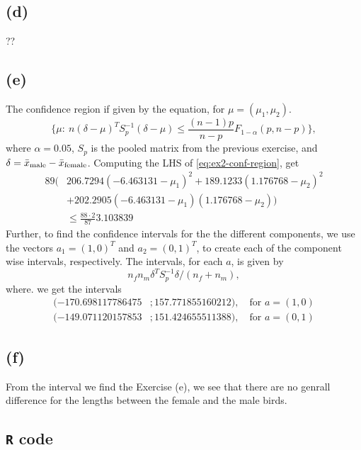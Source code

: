 \subsection*{(d)}
\label{sec:d}
??

\subsection*{(e)}
\label{sec:e}

The confidence region if given by the equation, for $\mu = (\mu_1, \mu_2).$
\begin{equation}
  \label{eq:ex2-conf-region}
 \{\mu:\ n (\delta - \mu)^T S_p^{-1} (\delta-\mu)\leq \frac{(n-1)p}{n-p}F_{1-\alpha}(p,n-p)\},
\end{equation}
where $\alpha = 0.05$, $S_p$ is the pooled matrix from the previous
exercise, and $\delta = \bar{x}_{\rm male}  - \bar{x}_{\rm
  female}$. Computing the LHS of \eqref{eq:ex2-conf-region}, get
\begin{align*}
  89
  \big(
    &206.7294 ( - 6.463131 -\mu_1)^2 + 189.1233(1.176768 -\mu_2)^2 \\
    &+ 202.2905(- 6.463131 - \mu_1)(1.176768- \mu_2)
  \big)\\
  &\leq \frac{88\cdot 2}{87}3.103839
\end{align*}
Further, to find the confidence intervals for the the different
components, we use the vectors $a_1 = (1,0)^T$ and $a_2 = (0,1)^T$, to
create each of the component wise intervals, respectively. The
intervals, for each $a$, is given by 
\begin{equation*}
  n_f n_m \delta^T S_p^{-1} \delta / (n_f + n_m) , 
\end{equation*}
where.
we get the intervals
\begin{align*}
  (-170.698117786475&; 157.771855160212), \quad \text{for } a = (1,0)
  \\
  (-149.071120157853&;151.424655511388), \quad \text{for } a = (0,1)
\end{align*}

\subsection*{(f)}
\label{sec:f}

From the interval we find the Exercise (e), we see that there are no
genrall difference for the lengths between the female and the male birds.
\subsection*{\texttt{R} code}
\label{sec:textttr-code}



